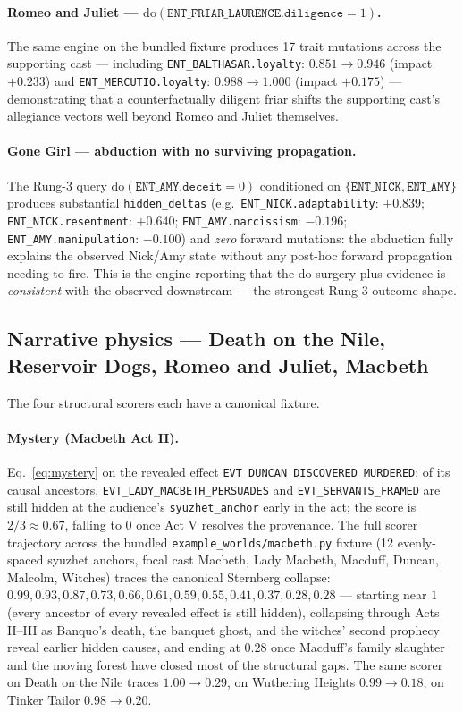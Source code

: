 \documentclass[11pt]{article}
\begin{document}
\paragraph{Romeo and Juliet ---
$\mathrm{do}(\texttt{ENT\_FRIAR\_LAURENCE.diligence}{=}1)$.}
The same engine on the bundled fixture produces 17 trait
mutations across the supporting cast --- including
\texttt{ENT\_BALTHASAR.loyalty}: $0.851 \!\to\! 0.946$ (impact
$+0.233$) and \texttt{ENT\_MERCUTIO.loyalty}: $0.988 \!\to\! 1.000$
(impact $+0.175$) --- demonstrating that a counterfactually
diligent friar shifts the supporting cast's allegiance vectors
well beyond Romeo and Juliet themselves.

\paragraph{Gone Girl --- abduction with no surviving
propagation.} The Rung-3 query
$\mathrm{do}(\texttt{ENT\_AMY.deceit}{=}0)$ conditioned on
$\{\texttt{ENT\_NICK}, \texttt{ENT\_AMY}\}$ produces substantial
\texttt{hidden\_deltas} (e.g.\
\texttt{ENT\_NICK.adaptability}: $+0.839$;
\texttt{ENT\_NICK.resentment}: $+0.640$;
\texttt{ENT\_AMY.narcissism}: $-0.196$;
\texttt{ENT\_AMY.manipulation}: $-0.100$) and \emph{zero}
forward mutations: the abduction fully explains the observed
Nick/Amy state without any post-hoc forward propagation needing
to fire. This is the engine reporting that the do-surgery plus
evidence is \emph{consistent} with the observed downstream ---
the strongest Rung-3 outcome shape.

\subsection{Narrative physics --- Death on the Nile, Reservoir
Dogs, Romeo and Juliet, Macbeth}
\label{app:ex-narrative}

The four structural scorers each have a canonical fixture.

\paragraph{Mystery (Macbeth Act II).} Eq.~\ref{eq:mystery} on the
revealed effect \texttt{EVT\_DUNCAN\_DISCOVERED\_MURDERED}: of
its causal ancestors, \texttt{EVT\_LADY\_MACBETH\_PERSUADES} and
\texttt{EVT\_SERVANTS\_FRAMED} are still hidden at the audience's
\texttt{syuzhet\_anchor} early in the act; the score is
$2/3 \approx 0.67$, falling to $0$ once Act V resolves the
provenance. The full scorer trajectory across the bundled
\texttt{example\_worlds/macbeth.py} fixture (12 evenly-spaced
syuzhet anchors, focal cast Macbeth, Lady Macbeth, Macduff,
Duncan, Malcolm, Witches) traces the canonical Sternberg
collapse: $0.99, 0.93, 0.87, 0.73, 0.66, 0.61, 0.59, 0.55,
0.41, 0.37, 0.28, 0.28$ --- starting near $1$ (every ancestor
of every revealed effect is still hidden), collapsing through
Acts II--III as Banquo's death, the banquet ghost, and the
witches' second prophecy reveal earlier hidden causes, and
ending at $0.28$ once Macduff's family slaughter and the moving
forest have closed most of the structural gaps. The same
scorer on Death on the Nile traces $1.00 \!\to\! 0.29$, on
Wuthering Heights $0.99 \!\to\! 0.18$, on Tinker Tailor
$0.98 \!\to\! 0.20$.
\end{document}
